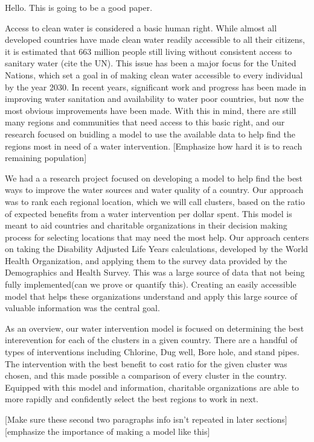 Hello. This is going to be a good paper.

Access to clean water is considered a basic human right. While almost all developed countries have made clean water readily accessible to all their citizens, it is estimated that 663 million people still living without consistent access to sanitary water (cite the UN).
This issue has been a major focus for the United Nations, which set a goal in of making clean water accessible to every individual by the year 2030.
In recent years, significant work and progress has been made in improving water sanitation and availability to water poor countries, but now the most obvious improvements have been made.
With this in mind, there are still many regions and communities that need access to this basic right, and our research focused on buidling a model to use the available data to help find the regions most in need of a water intervention. 
[Emphasize how hard it is to reach remaining population] 

We had a a research project focused on developing a model to help find the best ways to improve the water sources and water quality of a country.
Our approach was to rank each regional location, which we will call clusters, based on the ratio of expected benefits from a water intervention per dollar spent.
This model is meant to aid countries and charitable organizations in their decision making process for selecting locations that may need the most help.
Our approach centers on taking the Disability Adjusted Life Years calculations, developed by the World Health Organization, and applying them to the survey data provided by the Demographics and Health Survey.
This was a large source of data that not being fully implemented(can we prove or quantify this).
Creating an easily accessible model that helps these organizations understand and apply this large source of valuable information was the central goal.  

As an overview, our water intervention model is focused on determining the best interevention for each of the clusters in a given country.
There are a handful of types of interventions including Chlorine, Dug well, Bore hole, and stand pipes.
The intervention with the best benefit to cost ratio for the given cluster was chosen, and this made possible a comparison of every cluster in the country.
Equipped with this model and information, charitable organizations are able to more rapidly and confidently select the best regions to work in next.

[Make sure these second two paragraphs info isn't repeated in later sections]
[emphasize the importance of making a model like this]
